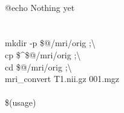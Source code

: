 \begin{makefileread}
 \\
\tab @echo Nothing yet \\

 \\

 \\
\tab mkdir -p \$@/mri/orig ;\textbackslash \\
\tab cp \$\textasciicircum \$@/mri/orig ;\textbackslash \\
\tab cd \$@/mri/orig ;\textbackslash \\
\tab mri_convert T1.nii.gz 001.mgz \\

 \\
\tab \$(usage) \\
\restoregeometry

\end{makefileread}

